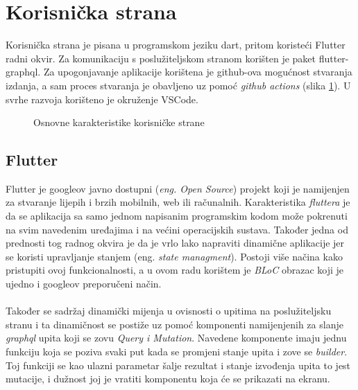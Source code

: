 \documentclass[times, utf8, zavrsni]{fer}
\begin{document}
\section{Korisnička strana}
Korisnička strana je pisana u programskom jeziku dart, pritom koristeći
Flutter radni okvir.
Za komunikaciju s poslužiteljskom stranom korišten je paket flutter-graphql.
Za upogonjavanje aplikacije korištena je github-ova mogućnost
stvaranja izdanja, a sam proces stvaranja je obavljeno uz pomoć \textit{github actions} (slika \ref{fig:Frontend}).
U svrhe razvoja korišteno je okruženje VSCode.
\begin{figure}[h]
      \centering
      \caption{Osnovne karakteristike korisničke strane}
      \label{fig:Frontend}
\end{figure}

\subsection{Flutter}
Flutter je googleov javno dostupni (\textit{eng. Open Source}) projekt koji je namijenjen
za stvaranje lijepih i brzih mobilnih, web ili računalnih. Karakteristika
\textit{fluttera } je da se aplikacija sa samo jednom napisanim programskim kodom može pokrenuti na
svim navedenim uređajima i na većini operacijskih sustava. Također jedna od prednosti tog radnog okvira je da je vrlo lako napraviti
dinamične aplikacije jer se koristi upravljanje stanjem (eng. \textit{state managment}). Postoji više načina
kako pristupiti ovoj funkcionalnosti, a u ovom radu korištem je \textit{BLoC} obrazac koji je ujedno
i googleov preporučeni način.
\\\\
Također se sadržaj dinamički mijenja u ovisnosti o upitima na poslužiteljsku stranu i ta dinamičnost
se postiže uz pomoć komponenti namijenjenih za slanje \textit{graphql} upita koji se zovu \textit{Query i Mutation}.
Navedene komponente imaju jednu funkciju koja se poziva svaki put kada se promjeni stanje upita i
zove se \textit{builder}. Toj funkciji se kao ulazni parametar šalje rezultat i stanje izvođenja upita to jest mutacije,
i dužnost joj je vratiti komponentu koja će se prikazati na ekranu.
\end{document}

